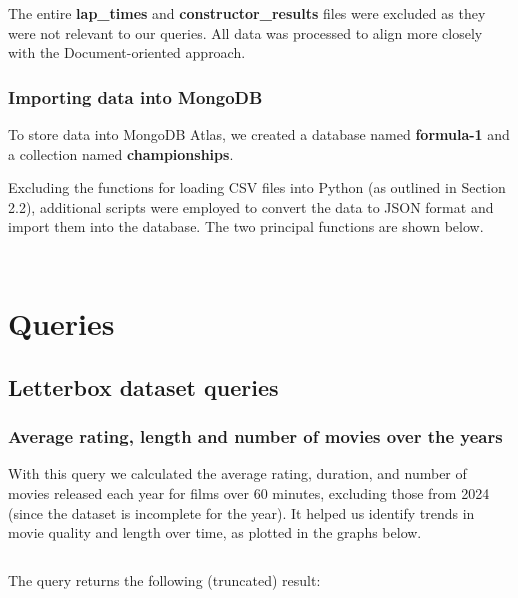 \documentclass{Configuration_Files/PoliMi3i_thesis}
\begin{document}
The entire \textbf{lap\_times} and \textbf{constructor\_results} files were excluded as they were not relevant to our queries. All data was processed to align more closely with the Document-oriented approach.

\subsection*{Importing data into MongoDB}
To store data into MongoDB Atlas, we created a database named \textbf{formula-1} and a collection named \textbf{championships}.

Excluding the functions for loading CSV files into Python (as outlined in Section 2.2), additional scripts were employed to convert the data to JSON format and import them into the database. The two principal functions are shown below.

\vspace{0.5cm}
\inputminted{python}{formula1/export.py}

\vspace{0.5cm}
\inputminted{python}{formula1/import.py}



\chapter{Queries}

\section{Letterbox dataset queries}

\subsection{Average rating, length and number of movies over the years}

With this query we calculated the average rating, duration, and number of movies released each year for films over 60 minutes, excluding those from 2024 (since the dataset is incomplete for the year). It helped us identify trends in movie quality and length over time, as plotted in the graphs below.

\inputminted[frame=single,framesep=10pt,breaklines]{cypher}{letterboxd/queries/query1.cypher}

The query returns the following (truncated) result:
\end{document}
